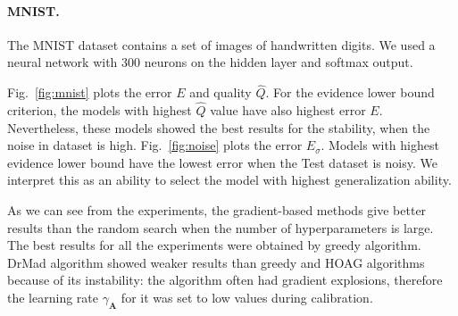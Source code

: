 \documentclass[smallcondensed]{svjour3}
\begin{document}
\paragraph{MNIST.}
The MNIST dataset contains a set of images of handwritten digits. 
We used a neural network with 300 neurons on the hidden layer and softmax output.


Fig.~\ref{fig:mnist} plots the error $E$ and quality $\hat{Q}$.
For the evidence lower bound criterion, the models with highest $\hat{Q}$ value have also highest error $E$. Nevertheless, 
these models showed the best results for the stability, when the noise in dataset is high. Fig.~\ref{fig:noise} plots  the error $E_\sigma$. Models with highest evidence lower bound have the lowest error when the Test dataset is noisy. We interpret this as an ability to select the model with highest generalization ability.

As we can see from the experiments, the gradient-based methods give better results than the random search when the number of hyperparameters is large. The best results for all the experiments were obtained by greedy algorithm. DrMad algorithm showed weaker results than greedy and HOAG algorithms because of its instability: the algorithm often had gradient explosions, therefore the learning rate $\gamma_{\mathbf{A}}$ for it was set to low values during calibration. 
\end{document}
